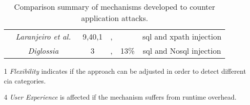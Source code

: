 \documentclass[conference]{IEEEtran}
\newcommand{\xmark}{\ding{56}}
\begin{document}
\begin{landscape}
\begin{table}
\begin{threeparttable}
\begin{small}
{\begin{tabular}{l|c|c|cc|c}
	& 	{\it Laranjeiro et al.}~\cite{LVM09,ALVM09,LVM10} & 9,40,1 & \xmark,\xmark  & \xmark & {\sc sql} and {\sc xp}ath injection \\
	& 	{\it Diglossia}~\cite{SMS13} & 3 & \xmark,\xmark  & 13\% & {\sc sql} and No{\sc sql} injection \\
	\hline
    \end{tabular}}
    \begin{tablenotes}
	\begin{footnotesize}
       \item[1] {\it Flexibility} indicates if the approach can be adjusted
	in order to detect different {\sc cia} categories.
       \item[4] {\it User Experience} is affected if the mechanism suffers
	from runtime overhead.
	\end{footnotesize}
    \end{tablenotes}
    \caption{Comparison summary of mechanisms developed to counter application attacks.}
    \label{tab:comp2}
    \end{small}
    \end{threeparttable}
\end{table}
\end{landscape}
\end{document}
